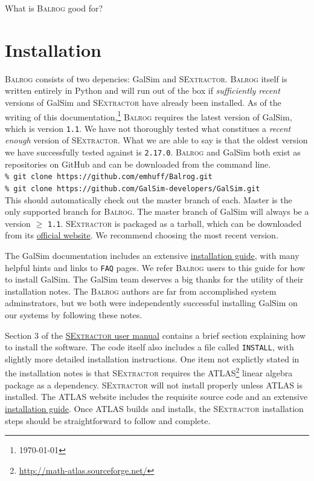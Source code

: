 \documentclass[12pt]{book}
\newcommand{\py}{Python}
\newcommand{\galsim}{GalSim}
\newcommand{\balrog}{\textsc{Balrog}}
\newcommand{\sex}{\textsc{SExtractor}}
\newcommand{\inline}{\\[0.4cm]}
\newcommand{\ericdate}{\mydate\today}
\begin{document}
What is \balrog{} good for?


\chapter{Installation}
\label{sec:install}

\balrog{} consists of two depencies: \galsim{} and \sex{}.
\balrog{} itself is written entirely in \py{} and will run out of the box if  
\emph{sufficiently recent} versions of \galsim{} and \sex{} have already been installed.
As of the writing of this documentation,\footnote{\label{foot:date}\ericdate} 
\balrog{} requires the latest version of \galsim{}, which is version \texttt{1.1}.
We have not thoroughly tested what constitues a \emph{recent enough} version of \sex{}.
What we are able to say is that the oldest version we have successfully tested against is \texttt{2.17.0}.
\balrog{} and \galsim{} both exist as repositories on GitHub and can be downloaded 
from the command line.
\inline
\texttt{\% git clone https://github.com/emhuff/Balrog.git} \\
\texttt{\% git clone https://github.com/GalSim-developers/GalSim.git}
\inline
This should automatically check out the master branch of each.
Master is the only supported branch for \balrog{}. 
The master branch of \galsim{} will always be a version $\geq$ \texttt{1.1}.
\sex{} is packaged as a tarball, which can be downloaded 
from its \href{https://www.astromatic.net/software/sextractor}{official website}.
We recommend choosing the most recent version.

The \galsim{} documentation includes an extensive
\href{https://github.com/GalSim-developers/GalSim/blob/releases/1.0/INSTALL.md}{installation guide},
with many helpful hints and links to \texttt{FAQ} pages. 
We refer \balrog{} users to this guide for how to install \galsim{}.
The \galsim{} team deserves a big thanks for the utility of their installation notes.
The \balrog{} authors are far from accomplished system adminstrators, 
but we both were independently successful installing \galsim{} on our systems by following these notes.

Section 3 of the \href{https://www.astromatic.net/pubsvn/software/sextractor/trunk/doc/sextractor.pdf}{\sex{} user manual}
contains a brief section explaining how to install the software. The code itself also includes a file called \texttt{INSTALL}, with
slightly more detailed installation instructions.
One item not explictly stated in the installation notes is that \sex{} requires the ATLAS\footnote{\url{http://math-atlas.sourceforge.net/}}
linear algebra package as a dependency.
\sex{} will not install properly unless ATLAS is installed. 
The ATLAS website includes the requisite source code and
an extensive \href{http://math-atlas.sourceforge.net/atlas_install/}{installation guide}.
Once ATLAS builds and installs, the \sex{} installation steps should be straightforward to follow and complete.
\end{document}

